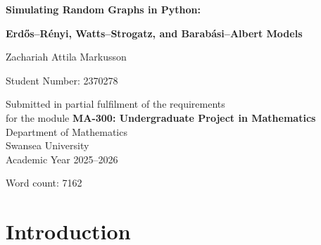 \documentclass[12pt, a4paper]{report}
\theoremstyle{definition}
\theoremstyle{plain}
\theoremstyle{remark}
\begin{document}
\begin{titlepage}
  \centering
  \vspace*{3cm}
  {\LARGE\bfseries Simulating Random Graphs in Python:\par}
  \vspace{0.4cm}
  {\large\bfseries
    Erd\H{o}s--R\'{e}nyi, Watts--Strogatz, and
    Barab\'{a}si--Albert Models\par}
  \vspace{2.5cm}
  {\large Zachariah Attila Markusson\par}
  \vspace{0.5cm}
  {\normalsize Student Number: 2370278\par}
  \vspace{2cm}
  {\normalsize
    Submitted in partial fulfilment of the requirements\\
    for the module \textbf{MA-300: Undergraduate Project in
    Mathematics}\\[0.3cm]
    Department of Mathematics\\
    Swansea University\\[0.3cm]
    Academic Year 2025--2026\par}
  \vfill
  {\small Word count: 7162}
\end{titlepage}

\tableofcontents
\listoffigures
\newpage
\chapter{Introduction}
\label{chap:intro}
\end{document}
